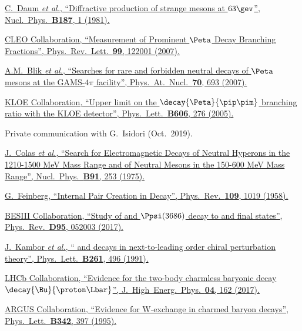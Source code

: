 \href{https://doi.org/10.1016/0550-3213(81)90114-0}{C.~Daum \textit{et al.}, \enquote{Diffractive production of strange mesons at $63\gev$}, Nucl.\ Phys.\ \textbf{B187}, 1 (1981).}

\href{https://doi.org/10.1103/PhysRevLett.99.122001}{CLEO Collaboration, \enquote{Measurement of Prominent $\Peta$ Decay Branching Fractions}, Phys.\ Rev.\ Lett.\ \textbf{99}, 122001 (2007).}

\href{https://doi.org/10.1134/S1063778807040102}{A.M.~Blik \textit{et al.}, \enquote{Searches for rare and forbidden neutral decays of $\Peta$ mesons at the GAMS-$4\pi$ facility}, Phys.\ At.\ Nucl.\ \textbf{70}, 693 (2007).}

\href{https://doi.org/10.1016/j.physletb.2004.12.025}{KLOE Collaboration, \enquote{Upper limit on the $\decay{\Peta}{\pip\pim}$ branching ratio with the KLOE detector}, Phys.\ Lett.\ \textbf{B606}, 276 (2005).}

Private communication with G.~Isidori (Oct.~2019).

\href{https://doi.org/10.1016/0550-3213(75)90469-1}{J.~Colas \textit{et al.}, \enquote{Search for Electromagnetic Decays of Neutral Hyperons in the 1210-1500 MeV Mass Range and of Neutral Mesons in the 150-600 MeV Mass Range}, Nucl.\ Phys.\ \textbf{B91}, 253 (1975).}

\href{https://doi.org/10.1103/PhysRev.109.1019}{G.~Feinberg, \enquote{Internal Pair Creation in \Sz Decay}, Phys.\ Rev.\ \textbf{109}, 1019 (1958).}

\href{https://doi.org/10.1103/PhysRevD.95.052003}{BESIII Collaboration, \enquote{Study of \jpsi and $\Ppsi(3686)$ decay to \Lz\Lbar and \Sz\Szbar final states}, Phys.\ Rev.\ \textbf{D95}, 052003 (2017).}

\href{https://doi.org/10.1016/0370-2693(91)90463-Z}{J.~Kambor \textit{et al.}, \enquote{\decay{\PK}{2\pion} and \decay{\PK}{3\pion} decays in next-to-leading order chiral perturbation theory}, Phys.\ Lett.\ \textbf{B261}, 496 (1991).}

\href{https://doi.org/10.1007/JHEP04(2017)162}{LHCb Collaboration, \enquote{Evidence for the two-body charmless baryonic decay $\decay{\Bu}{\proton\Lbar}$}, J.\ High\ Energ.\ Phys.\ \textbf{04}, 162 (2017).}

\href{https://doi.org/10.1016/0370-2693(94)01513-C}{ARGUS Collaboration, \enquote{Evidence for W-exchange in charmed baryon decays}, Phys.\ Lett.\ \textbf{B342}, 397 (1995).}

